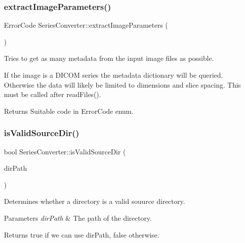 \subsubsection{\texorpdfstring{extract\+Image\+Parameters()}{extractImageParameters()}}
{\footnotesize\ttfamily Error\+Code Series\+Converter\+::extract\+Image\+Parameters (\begin{DoxyParamCaption}{ }\end{DoxyParamCaption})}



Tries to get as many metadata from the input image files as possible. 

If the image is a D\+I\+C\+OM series the metadata dictionary will be queried. Otherwise the data will likely be limited to dimensions and slice spacing. This must be called after read\+Files(). \begin{DoxyReturn}{Returns}
Suitable code in Error\+Code enum. 
\end{DoxyReturn}
\mbox{\label{class_series_converter_a88356a78d84c2d3aba7f4a340c4202ed}} 
\subsubsection{\texorpdfstring{is\+Valid\+Source\+Dir()}{isValidSourceDir()}}
{\footnotesize\ttfamily bool Series\+Converter\+::is\+Valid\+Source\+Dir (\begin{DoxyParamCaption}\item[{const Q\+String \&}]{dir\+Path }\end{DoxyParamCaption})}



Determines whether a directory is a valid souurce directory. 


\begin{DoxyParams}{Parameters}
{\em dir\+Path} & The path of the directory. \\
\hline
\end{DoxyParams}
\begin{DoxyReturn}{Returns}
true if we can use dir\+Path, false otherwise. 
\end{DoxyReturn}
\mbox{\label{class_series_converter_a1c8cd4b434f931afdbd719375aa64904}} 
